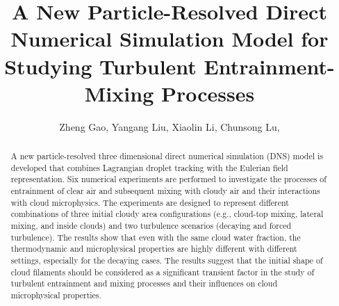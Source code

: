 \documentclass[draft,jgrga]{AGUTeX}
\begin{document}
\title{A New Particle-Resolved Direct Numerical Simulation Model for Studying Turbulent Entrainment-Mixing Processes}
\author{Zheng Gao,
Yangang Liu,
Xiaolin Li,
Chunsong Lu,}


\begin{abstract}
A new particle-resolved three dimensional direct numerical simulation (DNS) model is developed that combines Lagrangian droplet tracking with the Eulerian field representation. Six numerical experiments are performed to investigate the processes of entrainment of clear air and subsequent mixing with cloudy air and their interactions with cloud microphysics. The experiments are designed to represent different combinations of three initial cloudy area configurations (e.g., cloud-top mixing, lateral mixing, and inside clouds) and two turbulence scenarios (decaying and forced turbulence). The results show that even with the same cloud water fraction, the thermodynamic and microphysical properties are highly different with different settings, especially for the decaying cases. The results suggest that the initial shape of cloud filaments should be considered as a significant transient factor in the study of turbulent entrainment and mixing processes and their influences on cloud microphysical properties.   
\end{abstract}
\end{document}
